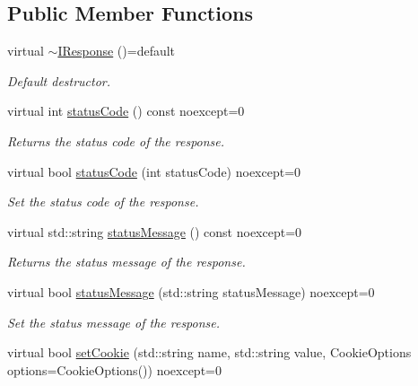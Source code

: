 \subsection*{Public Member Functions}
\begin{DoxyCompactItemize}
\item 
\mbox{\label{structhttp_1_1IResponse_aba6a570f0288e63f38b3a8835001a94e}} 
virtual \hyperlink{structhttp_1_1IResponse_aba6a570f0288e63f38b3a8835001a94e}{$\sim$\+I\+Response} ()=default
\begin{DoxyCompactList}\small\item\em Default destructor. \end{DoxyCompactList}\item 
virtual int \hyperlink{structhttp_1_1IResponse_ad980a7a0b5f1de80bd1faa84706e922f}{status\+Code} () const noexcept=0
\begin{DoxyCompactList}\small\item\em Returns the status code of the response. \end{DoxyCompactList}\item 
virtual bool \hyperlink{structhttp_1_1IResponse_a7d85b2b27acb82d13cf26eb0d3801735}{status\+Code} (int status\+Code) noexcept=0
\begin{DoxyCompactList}\small\item\em Set the status code of the response. \end{DoxyCompactList}\item 
virtual std\+::string \hyperlink{structhttp_1_1IResponse_a4339fd29b105c9ea5319b2e01f27290c}{status\+Message} () const noexcept=0
\begin{DoxyCompactList}\small\item\em Returns the status message of the response. \end{DoxyCompactList}\item 
virtual bool \hyperlink{structhttp_1_1IResponse_ae2a223c2d714b456f2a064e13cafc2e2}{status\+Message} (std\+::string status\+Message) noexcept=0
\begin{DoxyCompactList}\small\item\em Set the status message of the response. \end{DoxyCompactList}\item 
\mbox{\label{structhttp_1_1IResponse_ad682cbed4ec24a5c96979e2021794a15}} 
virtual bool \hyperlink{structhttp_1_1IResponse_ad682cbed4ec24a5c96979e2021794a15}{set\+Cookie} (std\+::string name, std\+::string value, Cookie\+Options options=Cookie\+Options()) noexcept=0

\end{DoxyCompactItemize}
